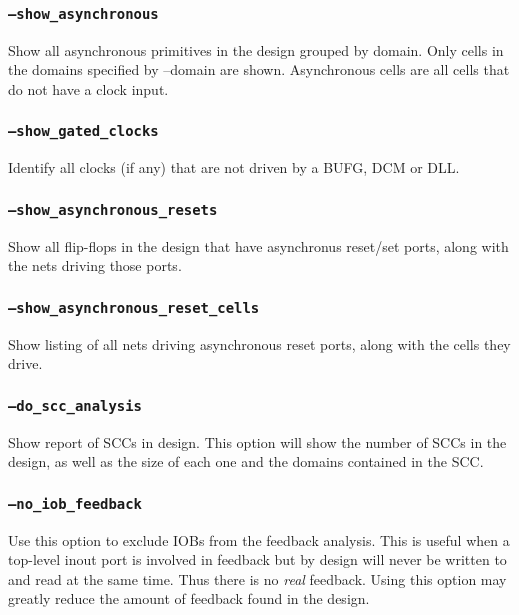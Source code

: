 \subsubsection{\texttt{--show\_asynchronous}}
Show all asynchronous primitives in the design grouped by domain. Only cells in
the domains specified by --domain are shown. Asynchronous cells are all cells
that do not have a clock input.

\subsubsection{\texttt{--show\_gated\_clocks}}
Identify all clocks (if any) that are not driven by a BUFG, DCM or DLL.

\subsubsection{\texttt{--show\_asynchronous\_resets}}
Show all flip-flops in the design that have asynchronus reset/set ports, along
with the nets driving those ports.

\subsubsection{\texttt{--show\_asynchronous\_reset\_cells}}
Show listing of all nets driving asynchronous reset ports, along with
the cells they drive.

\subsubsection{\texttt{--do\_scc\_analysis}}
Show report of SCCs in design.  This option will show the number of SCCs in the
design, as well as the size of each one and the domains contained in the SCC.

\subsubsection{\texttt{--no\_iob\_feedback}}
Use this option to exclude IOBs from the feedback analysis. This is useful when
a top-level inout port is involved in feedback but by design will never be 
written to and read at the same time. Thus there is no \emph{real} feedback.
Using this option may greatly reduce the amount of feedback found in the design.


%
%

